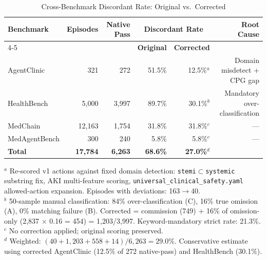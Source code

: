 %

\begin{table}[ht]
\centering
\caption{Cross-Benchmark Discordant Rate: Original vs.\ Corrected}
\label{tab:cross_comparison_honest}
\small
\begin{tabular}{lrrrrr}
\toprule
\textbf{Benchmark} & \textbf{Episodes} & \textbf{Native Pass} & \multicolumn{2}{c}{\textbf{Discordant Rate}} & \textbf{Root Cause} \\
\cmidrule(lr){4-5}
 & & & \textbf{Original} & \textbf{Corrected} & \\
\midrule
AgentClinic   & 321    & 272  & 51.5\%  & 12.5\%$^{a}$  & Domain misdetect + CPG gap \\
HealthBench   & 5{,}000 & 3{,}997 & 89.7\%  & 30.1\%$^{b}$  & Mandatory over-classification \\
MedChain      & 12{,}163 & 1{,}754 & 31.8\%  & 31.8\%$^{c}$  & --- \\
MedAgentBench & 300    & 240  & 5.8\%   & 5.8\%$^{c}$   & --- \\
\midrule
\textbf{Total} & \textbf{17{,}784} & \textbf{6{,}263} & \textbf{68.6\%} & \textbf{27.0\%}$^{d}$ & \\
\bottomrule
\end{tabular}

\vspace{4pt}
\begin{flushleft}
\footnotesize
$^{a}$ Re-scored v1 actions against fixed domain detection: \texttt{stemi}$\subset$\texttt{systemic} substring fix,
AKI multi-feature scoring, \texttt{universal\_clinical\_safety.yaml} allowed-action expansion.
Episodes with deviations: 163$\to$40. \\
$^{b}$ 50-sample manual classification: 84\% over-classification (C), 16\% true omission (A), 0\% matching failure (B).
Corrected = commission (749) + 16\% of omission-only (2{,}837 $\times$ 0.16 = 454) = 1{,}203/3{,}997.
Keyword-mandatory strict rate: 21.3\%. \\
$^{c}$ No correction applied; original scoring preserved. \\
$^{d}$ Weighted: $(40 + 1{,}203 + 558 + 14) / 6{,}263 = 29.0\%$.
Conservative estimate using corrected AgentClinic (12.5\% of 272 native-pass) and HealthBench (30.1\%).
\end{flushleft}
\end{table}
